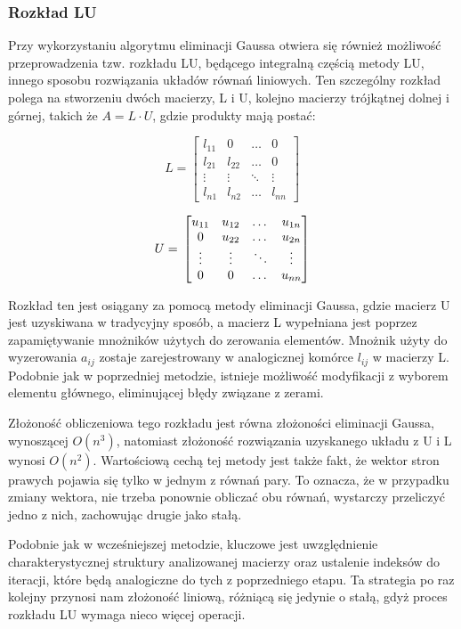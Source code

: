 \documentclass{article}
\begin{document}
\clearpage

\subsubsection*{Rozkład LU}
	Przy wykorzystaniu algorytmu eliminacji Gaussa otwiera się również możliwość przeprowadzenia tzw. rozkładu LU, będącego integralną częścią metody LU, innego sposobu rozwiązania układów równań liniowych. Ten szczególny rozkład polega na stworzeniu dwóch macierzy, L i U, kolejno macierzy trójkątnej dolnej i górnej, takich że $A = L \cdot U$, gdzie produkty mają postać:

	\[
	L = 
	\begin{bmatrix}
	l_{11} & 0 & \dots & 0 \\
	l_{21} & l_{22} & \dots & 0 \\
	\vdots & \vdots & \ddots & \vdots \\
	l_{n1} & l_{n2} & \dots & l_{nn}
	\end{bmatrix}
	\]

	\[
	U = \\
	\begin{bmatrix}
	u_{11} & u_{12} & \dots & u_{1n} \\
	0 & u_{22} & \dots & u_{2n} \\
	\vdots & \vdots & \ddots & \vdots \\
	0 & 0 & \dots & u_{nn}
	\end{bmatrix}
	\]

	Rozkład ten jest osiągany za pomocą metody eliminacji Gaussa, gdzie macierz U jest uzyskiwana w tradycyjny sposób, a macierz L wypełniana jest poprzez zapamiętywanie mnożników użytych do zerowania elementów. Mnożnik użyty do wyzerowania $a_{ij}$ zostaje zarejestrowany w analogicznej komórce $l_{ij}$ w macierzy L. Podobnie jak w poprzedniej metodzie, istnieje możliwość modyfikacji z wyborem elementu głównego, eliminującej błędy związane z zerami.

	Złożoność obliczeniowa tego rozkładu jest równa złożoności eliminacji Gaussa, wynoszącej $O(n^3)$, natomiast złożoność rozwiązania uzyskanego układu z U i L wynosi $O(n^2)$. Wartościową cechą tej metody jest także fakt, że wektor stron prawych pojawia się tylko w jednym z równań pary. To oznacza, że w przypadku zmiany wektora, nie trzeba ponownie obliczać obu równań, wystarczy przeliczyć jedno z nich, zachowując drugie jako stałą.


	Podobnie jak w wcześniejszej metodzie, kluczowe jest uwzględnienie charakterystycznej struktury analizowanej macierzy oraz ustalenie indeksów do iteracji, które będą analogiczne do tych z poprzedniego etapu. Ta strategia po raz kolejny przynosi nam złożoność liniową, różniącą się jedynie o stałą, gdyż proces rozkładu LU wymaga nieco więcej operacji.
\end{document}
